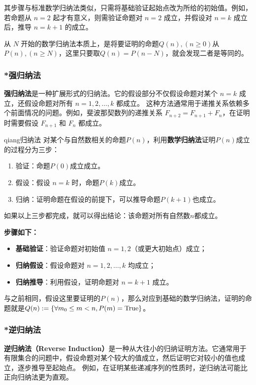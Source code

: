 其步骤与标准数学归纳法类似，只需将基础验证起始点改为所给的初始值。例如，
若命题从 $n = 2$ 起才有意义，则需验证命题对 $n = 2$ 成立，并假设对 $n = k$ 成立后，推导 $n = k+1$ 的成立。

从 $N$ 开始的数学归纳法本质上，是将要证明的命题$Q(n),(n\geq 0)$从$P(n),(n\geq N)$，这里只要取$Q(n)=P(n-N)$，就会发现二者是等同的。

\subsubsection{*强归纳法}

\textbf{强归纳法}是一种扩展形式的归纳法。它的假设部分不仅假设命题对某个 $n = k$ 成立，还假设命题对所有 $n = 1, 2, \dots, k$ 都成立。  
这种方法通常用于递推关系依赖多个前面情况的问题。例如，斐波那契数列的递推关系 $F_{n+2} = F_{n+1} + F_n$，在证明时需要假设 $F_{n+1}$ 和 $F_n$ 都成立。
\begin{definition}{qiang归纳法}
对某个与自然数相关的命题$P(n)$，利用\textbf{数学归纳法}证明$P(n)$成立的过程分为三步：
\begin{enumerate}
\item 验证：命题$P(0)$成立成立。
\item 假设：假设 $n = k$ 时，命题$P(k)$成立。
\item 归纳：证明命题在假设的前提下，可以推导命题$P(k+1)$也成立。
\end{enumerate}
如果以上三步都完成，就可以得出结论：该命题对所有自然数$n$都成立。
\end{definition}
\textbf{步骤如下：}
\begin{itemize}
    \item \textbf{基础验证}：验证命题对初始值 $n = 1, 2$（或更大初始点）成立；
    \item \textbf{归纳假设}：假设命题对 $n = 1, 2, \dots, k$ 均成立；
    \item \textbf{归纳推导}：利用假设，证明命题对 $n = k+1$ 成立。
\end{itemize}

与之前相同，假设这里要证明的$P(n)$，那么对应到基础的数学归纳法，证明的命题就是$Q(n):=\{\forall m_0\leq m<n,P(m)=\rm{True}\}$。

\subsubsection{*逆归纳法}

\textbf{逆归纳法（Reverse Induction）}是一种从大往小的归纳证明方法。它通常用于有限集合的问题中，假设命题对某个较大的值成立，然后证明它对较小的值也成立，逐步推导至起始点。  
例如，在证明某些递减序列的性质时，逆归纳法可能比正向归纳法更为直观。

